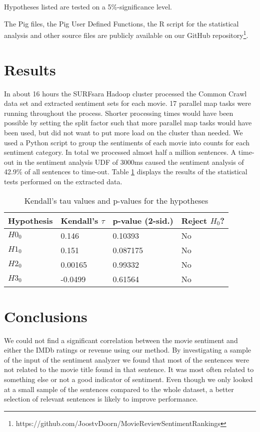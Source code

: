 \documentclass{acm_proc_article-sp}
\begin{document}
Hypotheses listed are tested on a 5\%-significance level.

The Pig files, the Pig User Defined Functions, the R script for the statistical analysis and other source files are publicly available on our GitHub repository\footnote{https://github.com/JoostvDoorn/MovieReviewSentimentRankings}.

\section{Results}
In about 16 hours the SURFsara Hadoop cluster processed the Common Crawl data set and extracted sentiment sets for each movie. 17 parallel map tasks were running throughout the process. Shorter processing times would have been possible by setting the split factor such that more parallel map tasks would have been used, but did not want to put more load on the cluster than needed. We used a Python script to group the sentiments of each movie into counts for each sentiment category. In total we processed almost half a million sentences. A time-out in the sentiment analysis UDF of 3000ms caused the sentiment analysis of 42.9\% of all sentences to time-out. Table \ref{tab:hypothesis_tests} displays the results of the statistical tests performed on the extracted data.
\begin{table}
\begin{tabular}{l|lll}
Hypothesis & Kendall's $\tau$ & p-value (2-sid.) & Reject $H_0$?\\
\hline
$H0_0$ & 0.146 & 0.10393 & No \\ 
$H1_0$ & 0.151 & 0.087175 & No \\ 
$H2_0$ & 0.00165 & 0.99332 & No \\ 
$H3_0$ & -0.0499 & 0.61564 & No\\ 
\end{tabular}
\caption{Kendall's tau values and p-values for the hypotheses}
\label{tab:hypothesis_tests}
\end{table}


\section{Conclusions}
We could not find a significant correlation between the movie sentiment and either the IMDb ratings or revenue using our method. By investigating a sample of the input of the sentiment analyzer we found that most of the sentences were not related to the movie title found in that sentence. It was most often related to something else or not a good indicator of sentiment. Even though we only looked at a small sample of the sentences compared to the whole dataset, a better selection of relevant sentences is likely to improve performance.
\end{document}
